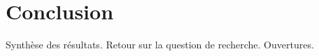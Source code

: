\chapter*{Conclusion}\label{ch:conclusion}

Synthèse des résultats. Retour sur la question de recherche. Ouvertures.
